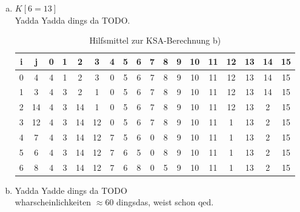 \documentclass[12pt.twoside,a4paper,notitlepage]{article}
\begin{document}
\begin{enumerate}[a)]
\item $K[6=13]$\\
Yadda Yadda dings da TODO.
\begin{table}[h]
\centering
\begin{tabular}{|c|c||c|c|c|c|c|c|c|c|c|c|c|c|c|c|c|c|}
\hline
i & j & 0 & 1 & 2 & 3 & 4 & 5 & 6 & 7 & 8 & 9 & 10 & 11 & 12 & 13 & 14 & 15 \\
\hline
0 & 4 & 4 & 1 & 2 & 3 & 0 & 5 & 6 & 7 & 8 & 9 & 10 & 11 & 12 & 13 & 14 & 15 \\
\hline
1 & 3 & 4 & 3 & 2 & 1 & 0 & 5 & 6 & 7 & 8 & 9 & 10 & 11 & 12 & 13 & 14 & 15 \\
\hline
2 & 14 & 4 & 3 & 14 & 1 & 0 & 5 & 6 & 7 & 8 & 9 & 10 & 11 & 12 & 13 & 2 & 15 \\
\hline
3 & 12 & 4 & 3 & 14 & 12 & 0 & 5 & 6 & 7 & 8 & 9 & 10 & 11 & 1 & 13 & 2 & 15 \\
\hline
4 & 7 & 4 & 3 & 14 & 12 & 7 & 5 & 6 & 0 & 8 & 9 & 10 & 11 & 1 & 13 & 2 & 15 \\
\hline
5 & 6 & 4 & 3 & 14 & 12 & 7 & 6 & 5 & 0 & 8 & 9 & 10 & 11 & 1 & 13 & 2 & 15 \\
\hline
6 & 8 & 4 & 3 & 14 & 12 & 7 & 6 & 8 & 0 & 5 & 9 & 10 & 11 & 1 & 13 & 2 & 15 \\
\hline
\end{tabular}
\caption{Hilfsmittel zur KSA-Berechnung b)}
\label{tab:ksa}
\end{table}

\item Yadda Yadde dings da TODO\\
wharscheinlichkeiten $\approx  60$ dingsdas, weist schon qed.

\end{enumerate}
\end{document}
